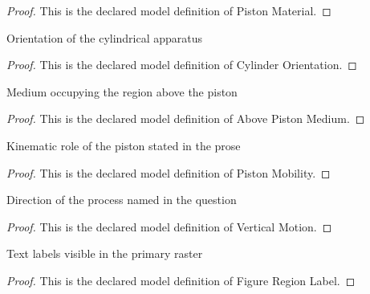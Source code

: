\begin{proof}
  This is the declared model definition of Piston Material.
\end{proof}
\begin{definition}
  \label{def:physics:phyx-mini-0407:phyxminiproblems-problemphyxmini0407-cylinderorientation}
  Orientation of the cylindrical apparatus
\end{definition}
\begin{proof}
  This is the declared model definition of Cylinder Orientation.
\end{proof}
\begin{definition}
  \label{def:physics:phyx-mini-0407:phyxminiproblems-problemphyxmini0407-abovepistonmedium}
  Medium occupying the region above the piston
\end{definition}
\begin{proof}
  This is the declared model definition of Above Piston Medium.
\end{proof}
\begin{definition}
  \label{def:physics:phyx-mini-0407:phyxminiproblems-problemphyxmini0407-pistonmobility}
  Kinematic role of the piston stated in the prose
\end{definition}
\begin{proof}
  This is the declared model definition of Piston Mobility.
\end{proof}
\begin{definition}
  \label{def:physics:phyx-mini-0407:phyxminiproblems-problemphyxmini0407-verticalmotion}
  Direction of the process named in the question
\end{definition}
\begin{proof}
  This is the declared model definition of Vertical Motion.
\end{proof}
\begin{definition}
  \label{def:physics:phyx-mini-0407:phyxminiproblems-problemphyxmini0407-figureregionlabel}
  Text labels visible in the primary raster
\end{definition}
\begin{proof}
  This is the declared model definition of Figure Region Label.
\end{proof}

